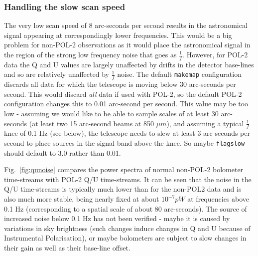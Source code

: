 \documentclass[twoside,11pt]{starlink}
\begin{document}
\subsubsection{Handling the slow scan speed}
\label{sec:slow}
The very low scan speed of 8 arc-seconds per second results in the
astronomical signal appearing at correspondingly lower frequencies. This
would be a big problem for non-POL-2 observations as it would place the
astronomical signal in the region of the strong low frequency noise that goes
as $\frac{1}{f}$. However, for POL-2 data the Q and U values are largely
unaffected by drifts in the detector base-lines and so are relatively
unaffected by $\frac{1}{f}$ noise. The default \texttt{makemap} configuration
discards all data for which the telescope is moving below 30 arc-seconds
per second. This would discard \emph{all} data if used with POL-2, so the
default POL-2 configuration changes this to 0.01 arc-second per
second. This value may be too low - assuming we would like to be
able to sample scales of at least 30 arc-seconds (at least two 15
arc-second beams at 850 $\mu m$), and assuming a typical $\frac{1}{f}$
knee of 0.1 Hz (see below), the telescope needs to slew at least 3 arc-seconds per
second to place sources in the signal band above the knee. So maybe
\texttt{flagslow} should default to 3.0 rather than 0.01.

Fig.~\ref{fig:qunoise} compares the power spectra of normal non-POL-2
bolometer time-streams with POL-2 Q/U time-streams. It can be seen that
the noise in the Q/U time-streams is typically much lower than for the
non-POL2 data and is also much more stable, being nearly fixed at about
$10^{-7} pW$ at frequencies above 0.1 Hz (corresponding to a spatial
scale of about 80 arc-seconds). The source of increased noise below 0.1
Hz has not been verified - maybe it is caused by variations in sky
brightness (such changes induce changes in Q and U because of
Instrumental Polarisation), or maybe bolometers are subject to slow changes
in their gain as well as their base-line offset.
\end{document}
